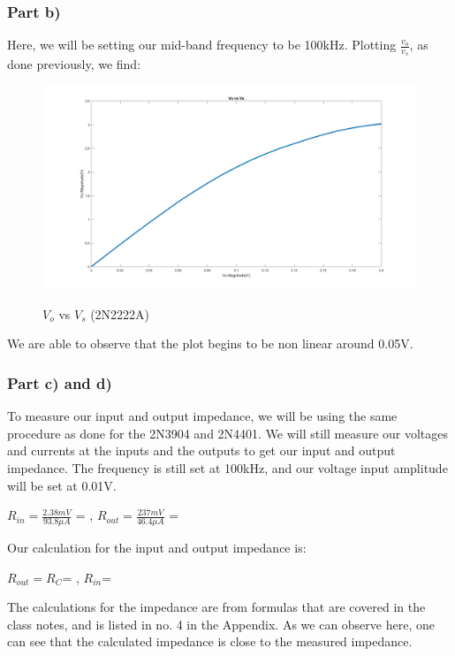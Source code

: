 \documentclass[12pt]{article}
\begin{document}
\subsubsection{Part b)}
Here, we will be setting our mid-band frequency to be 100kHz. Plotting $\frac{v_o}{v_s}$, as done previously, we find:

\begin{figure}[H]
\centering
\includegraphics[height=0.5\textwidth]{Images/voltage_transfer_plot_2N2222A.jpg}\\
\caption{$V_o$ vs $V_s$ (2N2222A)}
\label{fig:transfer_plot_2N2222A}
\end{figure}
We are able to observe that the plot begins to be non linear around 0.05V.

\subsubsection{Part c) and d)}

To measure our input and output impedance, we will be using the same procedure as done for the 2N3904 and 2N4401. We will still measure our voltages and currents at the inputs and the outputs to get our input and output impedance. The frequency is still set at 100kHz, and our voltage input amplitude will be set at 0.01V.

\begin{center}
$R_{in}=\frac{2.38mV}{93.8\mu A}$ = \boxed{25.373\Omega}, $R_{out}=\frac{237mV}{46.4\mu A}$ = 
\end{center}

Our calculation for the input and output impedance is:
\begin{center}
$R_{out}=R_C$= , $R_{in}$=\boxed{23.472\Omega}
\end{center}
The calculations for the impedance are from formulas that are covered in the class notes, and is listed in no. 4 in the Appendix. 
As we can observe here, one can see that the calculated impedance is close to the measured impedance.
\end{document}
